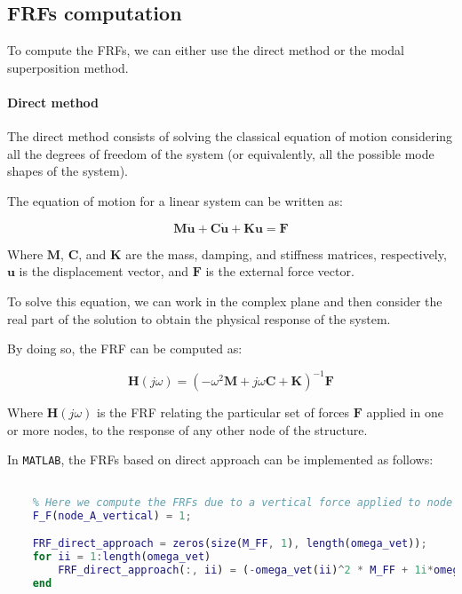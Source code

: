 \subsection{FRFs computation}
\label{subsec:FRFs_computation}

To compute the FRFs, we can either use the direct method or the modal superposition method.

\paragraph{Direct method}

The direct method consists of solving the classical equation of motion considering all the degrees of freedom of the system (or equivalently, all the possible mode shapes of the system).

The equation of motion for a linear system can be written as:

\begin{equation}
    \mathbf{M} \ddot{\mathbf{u}} + \mathbf{C} \dot{\mathbf{u}} + \mathbf{K} \mathbf{u} = \mathbf{F}
\end{equation}

Where $\mathbf{M}$, $\mathbf{C}$, and $\mathbf{K}$ are the mass, damping, and stiffness matrices, respectively, $\mathbf{u}$ is the displacement vector, and $\mathbf{F}$ is the external force vector.

To solve this equation, we can work in the complex plane and then consider the real part of the solution to obtain the physical response of the system.

By doing so, the FRF can be computed as:

\begin{equation}
    \mathbf{H}(j\omega) = (-\omega^2 \mathbf{M} + j\omega \mathbf{C} + \mathbf{K})^{-1} \mathbf{F}
\end{equation}

Where $\mathbf{H}(j\omega)$ is the FRF relating the particular set of forces $\mathbf{F}$ applied in one or more nodes, to the response of any other node of the structure.

In \texttt{MATLAB}, the FRFs based on direct approach can be implemented as follows:

\begin{lstlisting}[language=Matlab]

    % Here we compute the FRFs due to a vertical force applied to node A with module 1
    F_F(node_A_vertical) = 1;

    FRF_direct_approach = zeros(size(M_FF, 1), length(omega_vet));
    for ii = 1:length(omega_vet)
        FRF_direct_approach(:, ii) = (-omega_vet(ii)^2 * M_FF + 1i*omega_vet(ii) * C_FF + K_FF) \ F_F;
    end

\end{lstlisting}


